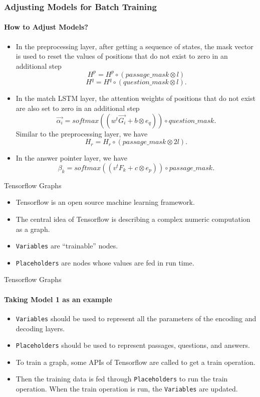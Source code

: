 \documentclass{beamer}
\begin{document}
\begin{frame}\frametitle{Adjusting Models for Batch Training}\framesubtitle{How to Adjust Models?}
    \begin{itemize}
        \item In the preprocessing layer, after getting a sequence of states, the mask vector is used to reset the values of positions that do not exist to zero in an additional step
        $$H^p = H^p \circ (passage\_mask \otimes l)$$
        $$H^q = H^q \circ (question\_mask \otimes l).$$
        \item In the match LSTM layer, the attention weights of positions that do not exist are also set to zero in an additional step
        $$\overrightarrow{\alpha _i} = softmax( (w^t\overrightarrow{G_i} + b \otimes e_q) ) \circ question\_mask .$$
        Similar to the preprocessing layer, we have
        $$H_r = H_r \circ (passage\_mask \otimes 2l).$$
        \item In the answer pointer layer, we have
        $$\beta _k = softmax( (v^tF_k + c \otimes e_p) ) \circ passage\_mask.$$
    \end{itemize}
\end{frame}

\begin{frame}{Tensorflow Graphs}
    \begin{itemize}
        \item Tensorflow is an open source machine learning framework.
        \item The central idea of Tensorflow is describing a complex numeric computation as a graph.
        \item {\tt Variables} are ``trainable'' nodes.
        \item {\tt Placeholders} are nodes whose values are fed in run time.
    \end{itemize}
\end{frame}

\begin{frame}{Tensorflow Graphs}\framesubtitle{Taking Model 1 as an example}
     \begin{itemize}
         \item {\tt Variables} should be used to represent all the parameters of the encoding and decoding layers.
         \item {\tt Placeholders} should be used to represent passages, questions, and answers.
         \item To train a graph, some APIs of Tensorflow are called to get a train operation.
         \item Then the training data is fed through {\tt Placeholders} to run the train operation. When the train operation is run, the {\tt Variables} are updated.
     \end{itemize}
\end{frame}
\end{document}
